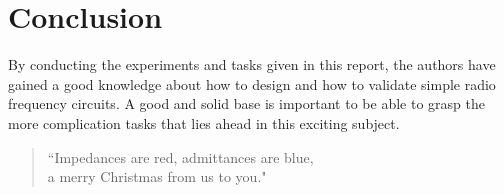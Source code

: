 \documentclass[report.tex]{subfiles}
\begin{document}
\pagebreak \section{Conclusion}
By conducting the experiments and tasks given in this report, the authors have gained a good knowledge about how to design and how to validate simple radio frequency circuits. A good and solid base is important to be able to grasp the more complication tasks that lies ahead in this exciting subject.

\begin{quote}
``Impedances are red, admittances are blue,\\
a merry Christmas from us to you."
\end{quote}
\end{document}
